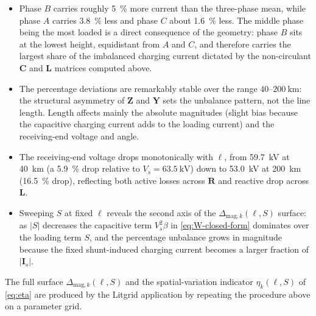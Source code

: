 \documentclass[11pt,a4paper]{article}
\newcommand{\matZ}{\bm{Z}}
\newcommand{\matY}{\bm{Y}}
\newcommand{\matR}{\bm{R}}
\newcommand{\matL}{\bm{L}}
\newcommand{\matC}{\bm{C}}
\newcommand{\vI}{\bm{I}}
\begin{document}
\begin{itemize}
\item Phase \(B\) carries roughly \SI{5}{\percent} more current than the
three-phase mean, while phase \(A\) carries \SI{3.8}{\percent} less and
phase \(C\) about \SI{1.6}{\percent} less. The middle phase being the most
loaded is a direct consequence of the geometry: phase \(B\) sits at the
lowest height, equidistant from \(A\) and \(C\), and therefore carries the
largest share of the imbalanced charging current dictated by the non-circulant
\(\matC\) and \(\matL\) matrices computed above.
\item The percentage deviations are remarkably stable over the range
\(40\text{--}\SI{200}{\kilo\metre}\): the structural asymmetry of \(\matZ\)
and \(\matY\) sets the unbalance pattern, not the line length. Length affects
mainly the absolute magnitudes (slight bias because the capacitive charging
current adds to the loading current) and the receiving-end voltage and angle.
\item The receiving-end voltage drops monotonically with \(\ell\), from
\SI{59.7}{\kilo\volt} at \SI{40}{\kilo\metre} (a \SI{5.9}{\percent} drop
relative to \(V_{s}=\SI{63.5}{\kilo\volt}\)) down to \SI{53.0}{\kilo\volt} at
\SI{200}{\kilo\metre} (\SI{16.5}{\percent} drop), reflecting both active
losses across \(\matR\) and reactive drop across \(\matL\).
\item Sweeping \(S\) at fixed \(\ell\) reveals the second axis of the
\(\Delta_{\mathrm{mag},k}(\ell,S)\) surface: as \(|S|\) decreases the
capacitive term \(V_{s}^{2}\beta\) in \eqref{eq:W-closed-form} dominates over
the loading term \(S\), and the percentage unbalance grows in magnitude
because the fixed shunt-induced charging current becomes a larger fraction
of \(|\vI_{s}|\).
\end{itemize}

The full surface
\(\Delta_{\mathrm{mag},k}(\ell,S)\) and the spatial-variation indicator
\(\eta_{k}(\ell,S)\) of \eqref{eq:eta} are produced by the Litgrid
application by repeating the procedure above on a parameter grid.
\end{document}
